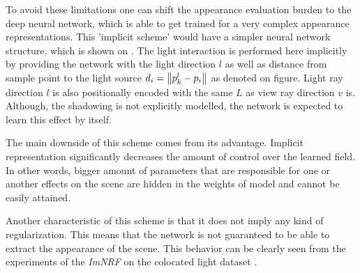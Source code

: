 To avoid
these limitations one can shift the appearance evaluation burden to the deep neural network,
which is able to get trained for a very complex appearance representations.
This 'implicit scheme' would have a simpler neural network structure,
which is shown on .
The light interaction is performed here implicitly by providing the network
with the light direction $l$ as well as distance from sample point to the light source $d_i = \norm{p^l_k - p_i}$
as denoted on figure.
Light ray direction $l$ is also positionally encoded with the same $L$ as view ray direction $v$ is.
Although, the shadowing is not explicitly modelled,
the network is expected to learn this effect by itself.

The main downside of this scheme comes from its advantage.
Implicit representation significantly decreases the amount of control over the learned field.
In other words, bigger amount of parameters that are responsible for one or another effects on the scene
are hidden in the weights of model and cannot be easily attained.

Another characteristic of this scheme is that it does not imply any kind of regularization.
This means that the network is not guaranteed to be able to extract the appearance of the scene.
This behavior can be clearly seen from the experiments of the \textit{ImNRF} on the colocated light dataset .








